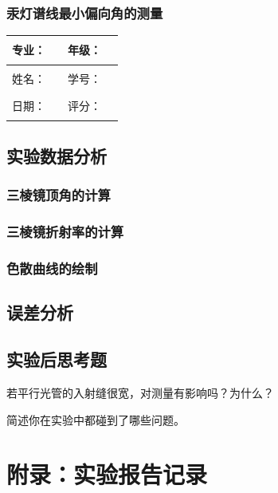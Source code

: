 \documentclass[dvipsnames, svgnames,a4paper,11pt]{article}
\newcommand{\recordblank}[1]{\par\vspace*{#1}\par}
\begin{document}
\subsubsection{汞灯谱线最小偏向角的测量}
\recordblank{5.0cm}
\clearpage
\noindent\begin{minipage}{\textwidth}
	\renewcommand\arraystretch{1.7}
	\begin{tabularx}{\textwidth}{|X|X|X|X|}
	\hline
	专业：& \rule{2.5cm}{0.4pt} & 年级：& \rule{2.5cm}{0.4pt}\\
	\hline
	姓名：& \rule{2.5cm}{0.4pt} & 学号：& \rule{2.5cm}{0.4pt}\\
	\hline
	日期：& \rule{2.5cm}{0.4pt} & 评分：& \rule{2.5cm}{0.4pt}\\
	\hline
	\end{tabularx}
\vspace{0.8em}
\subsection{实验数据分析}
\subsubsection{三棱镜顶角的计算}
\recordblank{3.5cm}
\end{minipage}

\subsubsection{三棱镜折射率的计算}
\recordblank{3.5cm}
\subsubsection{色散曲线的绘制}
\recordblank{3.5cm}
\subsection{误差分析}
\recordblank{3.5cm}
\subsection{实验后思考题}

\begin{question}
若平行光管的入射缝很宽，对测量有影响吗？为什么？
\end{question}
\recordblank{4cm}

\begin{question}
简述你在实验中都碰到了哪些问题。
\end{question}
\recordblank{4cm}

\clearpage
\appendix
\section*{附录：实验报告记录}

\recordblank{7cm}
\end{document}
